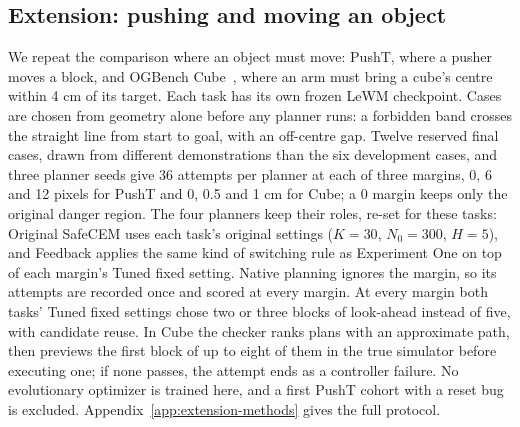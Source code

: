 \subsection{Extension: pushing and moving an object}\label{sec:extension}
We repeat the comparison where an object must move: PushT, where a pusher
moves a block, and OGBench Cube~\cite{park2025ogbench}, where an arm must
bring a cube's centre within 4 cm of its target. Each task has its own
frozen LeWM checkpoint. Cases are chosen from geometry alone before any
planner runs: a forbidden band crosses the straight line from start to goal,
with an off-centre gap. Twelve reserved final cases, drawn from different
demonstrations than the six development cases, and three planner seeds give
36 attempts per planner at each of three margins, 0, 6 and 12 pixels for
PushT and 0, 0.5 and 1 cm for Cube; a 0 margin keeps only the original
danger region. The four planners keep their roles, re-set for these tasks:
Original SafeCEM uses each task's original settings ($K=30$, $N_0=300$,
$H=5$), and Feedback applies the same kind of switching rule as
Experiment One on top of each margin's Tuned fixed setting. Native
planning ignores the margin, so its attempts are recorded once and scored at
every margin. At every margin both tasks' Tuned fixed settings chose two or
three blocks of look-ahead instead of five, with candidate reuse. In Cube
the checker ranks plans with an approximate path, then previews the first
block of up to eight of them in the true simulator before executing one; if
none passes, the attempt ends as a controller failure. No evolutionary
optimizer is trained here, and a first PushT cohort with a reset bug is
excluded. Appendix~\ref{app:extension-methods} gives the full protocol.
